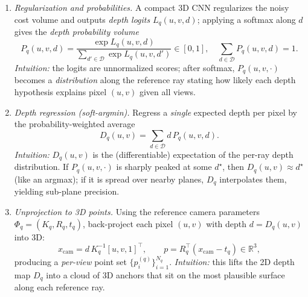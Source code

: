 \begin{enrichment}
\begin{enrichment}
\begin{enrichment}
\begin{itemize}
\begin{enumerate}
                \item \emph{Regularization and probabilities.} A compact 3D CNN regularizes the noisy cost volume and outputs \emph{depth logits} $L_q(u,v,d)$; applying a softmax along $d$ gives the \emph{depth probability volume}
                \[
                P_q(u,v,d)=\frac{\exp L_q(u,v,d)}{\sum_{d'\in\mathcal{D}}\exp L_q(u,v,d')}\in[0,1],\quad
                \sum_{d\in\mathcal{D}} P_q(u,v,d)=1.
                \]
                \emph{Intuition:} the logits are unnormalized scores; after softmax, $P_q(u,v,\cdot)$ becomes a \emph{distribution} along the reference ray stating how likely each depth hypothesis explains pixel $(u,v)$ given all views.
                
                \item \emph{Depth regression (soft-argmin).} Regress a \emph{single} expected depth per pixel by the probability-weighted average
                \[
                D_q(u,v)=\sum_{d\in\mathcal{D}} d\,P_q(u,v,d).
                \]
                \emph{Intuition:} $D_q(u,v)$ is the (differentiable) expectation of the per-ray depth distribution.
                If $P_q(u,v,\cdot)$ is sharply peaked at some $d^\star$, then $D_q(u,v)\!\approx\!d^\star$ (like an argmax); if it is spread over nearby planes, $D_q$ interpolates them, yielding sub-plane precision.
                
                \item \emph{Unprojection to 3D points.} Using the reference camera parameters $\Phi_q=(K_q,R_q,t_q)$, back-project each pixel $(u,v)$ with depth $d=D_q(u,v)$ into 3D:
                \[
                x_{\mathrm{cam}}=d\,K_q^{-1}[u,v,1]^\top,\qquad
                p=R_q^{\!\top}(x_{\mathrm{cam}}-t_q)\in\mathbb{R}^3,
                \]
                producing a \emph{per-view} point set $\{p_i^{(q)}\}_{i=1}^{N_q}$.
                \emph{Intuition:} this lifts the 2D depth map $D_q$ into a cloud of 3D anchors that sit on the most plausible surface along each reference ray.
                

\end{enumerate}
\end{itemize}
\end{enrichment}
\end{enrichment}
\end{enrichment}
